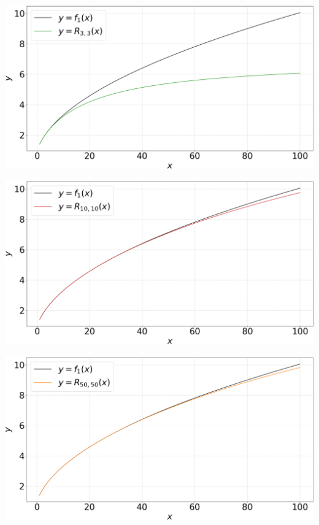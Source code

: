 \documentclass[12pt, a4paper]{article}
\begin{document}
\begin{minipage}{\textwidth}\centering
	\includegraphics[width=0.8\linewidth]{q3_L=3}
	\label{q3_L=3}
\end{minipage}
\vspace{0.1cm}

\begin{minipage}{\textwidth}\centering
	\includegraphics[width=0.8\linewidth]{q3_L=10}
	\label{q3_L=10}
\end{minipage}
\vspace{0.1cm}

\begin{minipage}{\textwidth}\centering
	\includegraphics[width=0.8\linewidth]{q3_L=50}

	\vspace*{-0.2cm}

	\label{q3_L=50}
\end{minipage}
\end{document}
